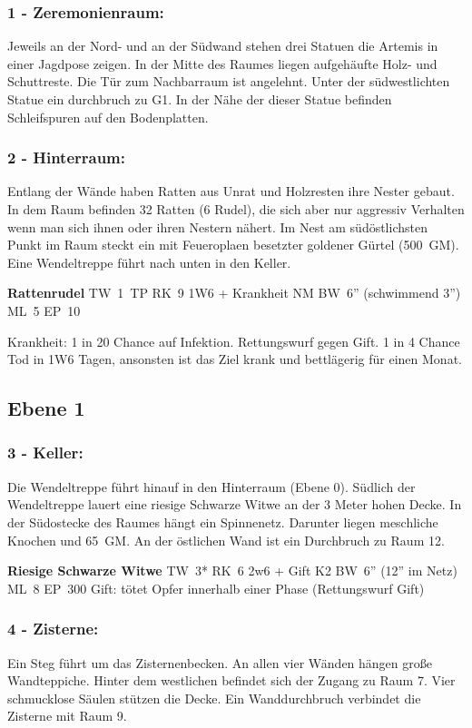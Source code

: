 \subsubsection{1 - Zeremonienraum:} Jeweils an der Nord- und an der Südwand stehen drei
Statuen die Artemis in einer Jagdpose zeigen. In der Mitte des Raumes
liegen aufgehäufte Holz- und Schuttreste. Die Tür zum Nachbarraum ist
angelehnt. Unter der südwestlichten Statue ein durchbruch zu G1. In
der Nähe der dieser Statue befinden Schleifspuren auf den Bodenplatten.

\subsubsection{2 - Hinterraum:} Entlang der Wände haben Ratten aus Unrat und Holzresten
ihre Nester gebaut. In dem Raum befinden 32 Ratten (6 Rudel), die sich
aber nur aggressiv Verhalten wenn man sich ihnen oder ihren Nestern
nähert. Im Nest am südöstlichsten Punkt im Raum steckt ein mit
Feueroplaen besetzter goldener Gürtel (500~GM). Eine Wendeltreppe führt
nach unten in den Keller.

\textbf{Rattenrudel} TW~1~TP RK~9 1W6 + Krankheit NM
BW~6'' (schwimmend 3'') ML~5 EP~10 

Krankheit: 1 in 20 Chance auf Infektion. Rettungswurf
gegen Gift. 1 in 4 Chance Tod in 1W6 Tagen, ansonsten ist das Ziel krank
und bettlägerig für einen Monat.

\subsection{Ebene 1}

\subsubsection{3 - Keller:} Die Wendeltreppe führt hinauf in den Hinterraum (Ebene
0). Südlich der Wendeltreppe lauert eine riesige Schwarze Witwe an
der 3 Meter hohen Decke.  In der Südostecke des Raumes hängt ein
Spinnenetz. Darunter liegen meschliche Knochen und 65~GM. An der östlichen
Wand ist ein Durchbruch zu Raum 12.

\textbf{Riesige Schwarze Witwe} TW~3* RK~6 2w6 + Gift K2 BW~6'' (12''
im Netz) ML~8 EP~300 
Gift: tötet Opfer innerhalb einer Phase (Rettungswurf Gift)

\subsubsection{4 - Zisterne:} Ein Steg führt um das Zisternenbecken. An allen vier
Wänden hängen große Wandteppiche. Hinter dem westlichen befindet sich
der Zugang zu Raum 7. Vier schmucklose Säulen stützen die Decke. Ein
Wanddurchbruch verbindet die Zisterne mit Raum 9.

